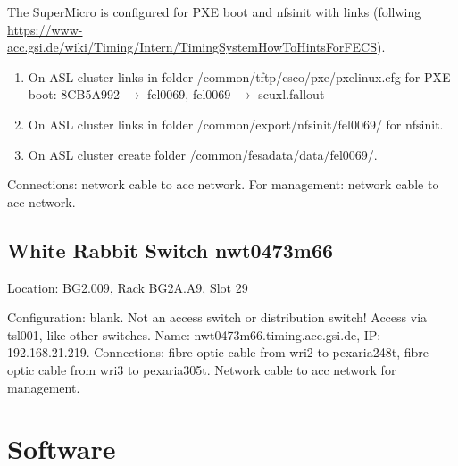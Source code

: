 \documentclass[12pt,a4paper]{report}
\begin{document}
The SuperMicro is configured for PXE boot and nfsinit with links (follwing
\url{https://www-acc.gsi.de/wiki/Timing/Intern/TimingSystemHowToHintsForFECS}).
\begin{enumerate}
\item On ASL cluster links in folder /common/tftp/csco/pxe/pxelinux.cfg for PXE boot:
8CB5A992 $\to$ fel0069,
fel0069 $\to$ scuxl.fallout
\item On ASL cluster links in folder /common/export/nfsinit/fel0069/ for nfsinit.
\item On ASL cluster create folder /common/fesadata/data/fel0069/.
\end{enumerate}
Connections: network cable to acc network. For management: network cable to acc network.
\section{White Rabbit Switch nwt0473m66}
Location: BG2.009, Rack BG2A.A9, Slot 29 \raggedright
\linebreak Configuration: blank. Not an access switch or distribution switch!
\linebreak Access via tsl001, like other switches.
\linebreak Name: nwt0473m66.timing.acc.gsi.de,
\linebreak IP: 192.168.21.219.
\linebreak Connections: fibre optic cable from wri2 to pexaria248t, fibre optic cable from wri3 to pexaria305t. Network cable to acc network for management.
\chapter{Software}
\end{document}

